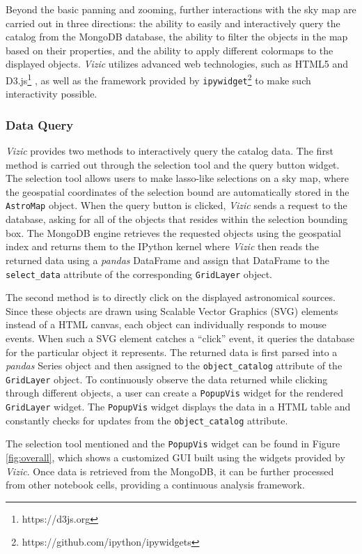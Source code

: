 \documentclass[../vis.tex]{subfiles}
\begin{document}
Beyond the basic panning and zooming, further interactions with the sky map are carried out in three directions:
the ability to easily and interactively query the catalog from the MongoDB database, the ability to filter the objects in the map based on their properties, and the ability to apply different colormaps to the displayed objects.
\textit{Vizic} utilizes advanced web technologies, such as HTML5 and D3.js\footnote{https://d3js.org} \citep{d3}, as well as the framework provided by \texttt{ipywidget}\footnote{https://github.com/ipython/ipywidgets} to make such interactivity possible.
\subsubsection{Data Query}
\label{data query}
\textit{Vizic} provides two methods to interactively query the catalog data. The first method is carried out through the selection tool and the query button widget. The selection tool allows users to make lasso-like selections on a sky map, where the geospatial coordinates of the selection bound are automatically stored in the \texttt{AstroMap} object.
When the query button is clicked, \textit{Vizic} sends a request to the database, asking for all of the objects that resides within the selection bounding box. The MongoDB engine retrieves the requested objects using the geospatial index and returns them to the IPython kernel where \textit{Vizic} then reads the returned data using a \textit{pandas} DataFrame and assign that DataFrame to the \texttt{select\_data} attribute of the corresponding \texttt{GridLayer} object.

The second method is to directly click on the displayed astronomical sources. Since these objects are drawn using Scalable Vector Graphics (SVG) elements instead of a HTML canvas, each object can individually responds to mouse events.
When such a SVG element catches a ``click'' event, it queries the database for the particular object it represents.
The returned data is first parsed into a \textit{pandas} Series object and then assigned to the \texttt{object\_catalog} attribute of the \texttt{GridLayer} object.
To continuously observe the data returned while clicking through different objects, a user can create a \texttt{PopupVis} widget for the rendered \texttt{GridLayer} widget. The \texttt{PopupVis} widget displays the data in a HTML table and constantly checks for updates from the \texttt{object\_catalog} attribute.

The selection tool mentioned and the \texttt{PopupVis} widget can be found in Figure \ref{fig:overall}, which shows a customized GUI built using the widgets provided by \textit{Vizic}.
Once data is retrieved from the MongoDB, it can be further processed from other notebook cells, providing a continuous analysis framework.
\end{document}
